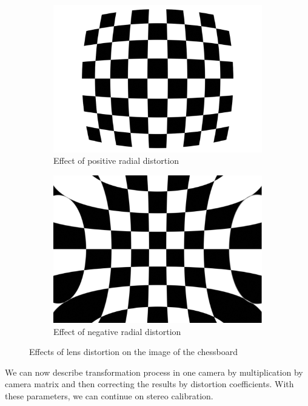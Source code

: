 \begin{figure}
	\begin{subfigure}[b]{0.48\linewidth}
		\includegraphics[width=\linewidth]{img/chessboard/7x8chessboard-positivedistortion}
		\caption{Effect of positive radial distortion}
	\end{subfigure}
	\begin{subfigure}[b]{0.48\linewidth}
		\includegraphics[width=\linewidth]{img/chessboard/7x8chessboard-negativedistortion}
		\caption{Effect of negative radial distortion}
	\end{subfigure}
	\caption{Effects of lens distortion on the image of the chessboard}
	\label{fig:distortion}
\end{figure}

We can now describe transformation process in one camera by multiplication by
camera matrix and then correcting the results by distortion coefficients. With
these parameters, we can continue on stereo calibration.

